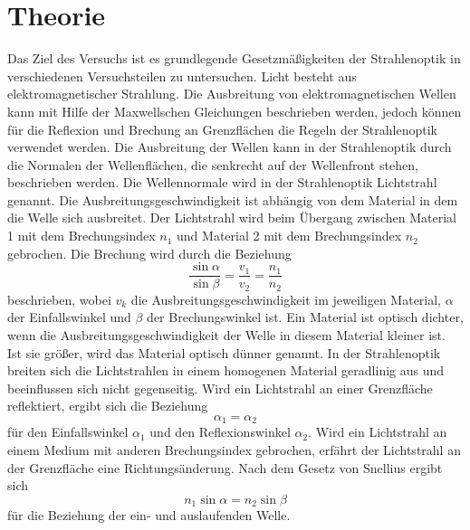 \section{Theorie}
\label{sec:Theorie}
Das Ziel des Versuchs ist es grundlegende Gesetzmäßigkeiten der Strahlenoptik in verschiedenen Versuchsteilen zu untersuchen.
Licht besteht aus elektromagnetischer Strahlung. Die Ausbreitung von elektromagnetischen Wellen kann mit Hilfe der Maxwellschen Gleichungen beschrieben werden,
jedoch können für die Reflexion und Brechung an Grenzflächen die Regeln der Strahlenoptik verwendet werden. 
Die Ausbreitung der Wellen kann in der Strahlenoptik durch die Normalen der Wellenflächen, die senkrecht auf der Wellenfront stehen, beschrieben werden. 
Die Wellennormale wird in der Strahlenoptik Lichtstrahl genannt. Die Ausbreitungsgeschwindigkeit ist abhängig von dem Material in dem die Welle sich ausbreitet.
Der Lichtstrahl wird beim Übergang zwischen Material 1 mit dem Brechungsindex $n_1$ und Material 2 mit dem Brechungsindex $n_2$ gebrochen. Die Brechung wird durch die Beziehung
\begin{equation}
    \frac{\sin \alpha}{\sin \beta} = \frac{v_1}{v_2}= \frac{n_1}{n_2}
    \label{eqn:brech}
\end{equation}
beschrieben, wobei $v_k$ die Ausbreitungsgeschwindigkeit im jeweiligen Material, $\alpha$ der Einfallswinkel und $\beta$ der Brechungswinkel ist.
Ein Material ist optisch dichter, wenn die Ausbreitungsgeschwindigkeit der Welle in diesem Material kleiner ist. Ist sie größer, wird das Material optisch dünner genannt.
In der Strahlenoptik breiten sich die Lichtstrahlen in einem homogenen Material geradlinig aus und beeinflussen sich nicht gegenseitig.
Wird ein Lichtstrahl an einer Grenzfläche reflektiert, ergibt sich die Beziehung
\begin{equation}
    \alpha_1=\alpha_2
    \label{eqn:refl}
\end{equation}
für den Einfallswinkel $\alpha_1$ und den Reflexionswinkel $\alpha_2$.
Wird ein Lichtstrahl an einem Medium mit anderen Brechungsindex gebrochen, erfährt der Lichtstrahl an der Grenzfläche eine Richtungsänderung.
Nach dem Gesetz von Snellius ergibt sich
\begin{equation}
    n_1 \sin \alpha = n_2 \sin \beta
    \label{eqn:brechung}
\end{equation}
für die Beziehung der ein- und auslaufenden Welle.
